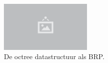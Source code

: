 \begin{figure}
  \centering
  \includegraphics[width=0.4\textwidth]{./img/raw/placeholder.png}
  \caption{De octree datastructuur als BRP.}
  \label{fig:hs-datastructuur-octree-bsp}
\end{figure}
